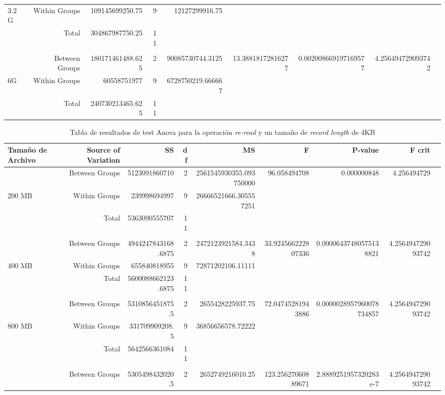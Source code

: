 \begin{landscape}
\begin{table}[!htp]
\begin{tabular}{lrrrrrrrr}
3.2G &Within Groups &109145699250.75 &9 &12127299916.75 & & & \\
&Total &304867987750.25 &11 & & & & \\
& & & & & & & \\
&Between Groups &180171461488.625 &2 &90085730744.3125 &13.38818172816277 &0.002008669197169577 &4.256494729093742 \\
6G &Within Groups &60558751977 &9 &6728750219.666667 & & & \\
&Total &240730213465.625 &11 & & & & \\
\bottomrule
\end{tabular}
\end{table}

\end{landscape}
\begin{landscape}
\begin{table}[!htp]\centering
\caption{Tabla de resultados de test Anova para la operación \textit{re-read} y un tamaño de \textit{record length} de 4KB}\label{tab: }
\scriptsize
\begin{tabular}{lrrrrrrrr}\toprule
Tamaño de Archivo &Source of Variation &SS &df &MS &F &P-value &F crit \\\midrule
&Between Groups &5123091860710 &2 &2561545930355.093750000 &96.058494708 &0.000000848 &4.256494729 \\
200 MB &Within Groups &239998694997 &9 &26666521666.305557251 & & & \\
&Total &5363090555707 &11 & & & & \\
& & & & & & & \\
&Between Groups &4944247843168.6875 &2 &2472123921584.3438 &33.924566222807336 &0.00006437480575138821 &4.256494729093742 \\
400 MB &Within Groups &655840818955 &9 &72871202106.11111 & & & \\
&Total &5600088662123.6875 &11 & & & & \\
& & & & & & & \\
&Between Groups &5310856451875.5 &2 &2655428225937.75 &72.04745281943886 &0.0000028957960078734857 &4.256494729093742 \\
800 MB &Within Groups &331709909208.5 &9 &36856656578.72222 & & & \\
&Total &5642566361084 &11 & & & & \\
& & & & & & & \\
&Between Groups &5305498432020.5 &2 &2652749216010.25 &123.25627060889671 &2.8889251957320283e-7 &4.256494729093742 \\

\end{tabular}
\end{table}
\end{landscape}
